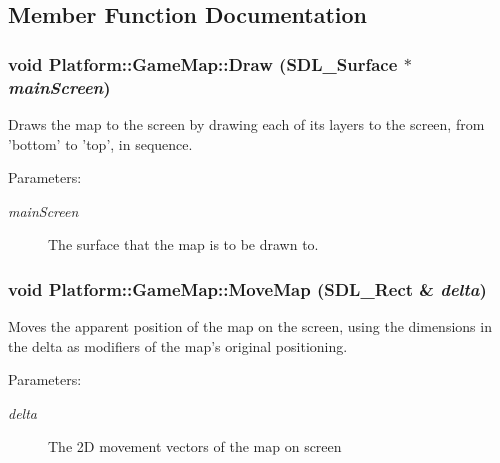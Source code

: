 \subsection{Member Function Documentation}
\hypertarget{class_platform_1_1_game_map_08581c79e3244f70c4e26b886b0479de}{
\subsubsection[{Draw}]{\setlength{\rightskip}{0pt plus 5cm}void Platform::GameMap::Draw (SDL\_\-Surface $\ast$ {\em mainScreen})}}
\label{de/db6/class_platform_1_1_game_map_08581c79e3244f70c4e26b886b0479de}


Draws the map to the screen by drawing each of its layers to the screen, from 'bottom' to 'top', in sequence.

\begin{Desc}
\item[Parameters:]
\begin{description}
\item[{\em mainScreen}]The surface that the map is to be drawn to. \end{description}
\end{Desc}
\hypertarget{class_platform_1_1_game_map_76634e9c99fe04d801cc324ba0b0ed8a}{
\subsubsection[{MoveMap}]{\setlength{\rightskip}{0pt plus 5cm}void Platform::GameMap::MoveMap (SDL\_\-Rect \& {\em delta})}}
\label{de/db6/class_platform_1_1_game_map_76634e9c99fe04d801cc324ba0b0ed8a}


Moves the apparent position of the map on the screen, using the dimensions in the delta as modifiers of the map's original positioning.

\begin{Desc}
\item[Parameters:]
\begin{description}
\item[{\em delta}]The 2D movement vectors of the map on screen \end{description}
\end{Desc}
